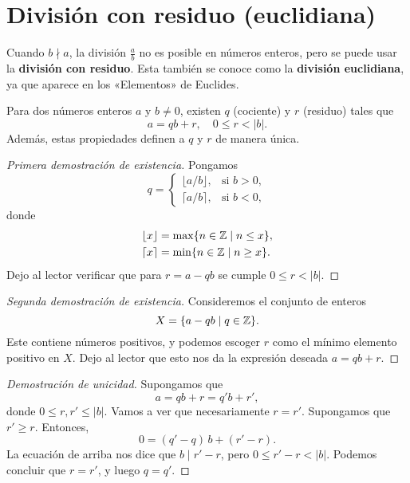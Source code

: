 
\section{División con residuo (euclidiana)}

Cuando $b \nmid a$, la división $\frac{a}{b}$ no es posible en números enteros,
pero se puede usar la \textbf{división con residuo}. Esta también se conoce como
la \textbf{división euclidiana}, ya que aparece en los «Elementos» de Euclides.

\begin{proposicion}
  Para dos números enteros $a$ y $b \ne 0$, existen $q$ (cociente) y $r$
  (residuo) tales que
  \[ a = qb + r,
    \quad
    0 \le r < |b|. \]
  Además, estas propiedades definen a $q$ y $r$ de manera única.
\end{proposicion}

\begin{proof}[Primera demostración de existencia]
  Pongamos
  \[ q =
    \begin{cases}
      \lfloor a/b\rfloor, & \text{si }b > 0,\\
      \lceil  a/b\rceil,  & \text{si }b < 0,
    \end{cases} \]
  donde
  \begin{align*}
    \lfloor x \rfloor & = \max \{ n \in \mathbb{Z} \mid n \le x \},\\
    \lceil x \rceil & = \min \{ n \in \mathbb{Z} \mid n \ge x \}.
  \end{align*}
  Dejo al lector verificar que para $r = a - qb$ se cumple $0 \le r < |b|$.
\end{proof}

\begin{proof}[Segunda demostración de existencia]
  Consideremos el conjunto de enteros
  $$X = \{ a - qb \mid q \in \mathbb{Z} \}.$$
  Este contiene números positivos, y podemos escoger $r$ como el mínimo elemento
  positivo en $X$. Dejo al lector que esto nos da la expresión deseada
  $a = qb + r$.
\end{proof}

\begin{proof}[Demostración de unicidad]
  Supongamos que
  $$a = qb + r = q' b + r',$$
  donde $0 \le r, r' \le |b|$. Vamos a ver que necesariamente $r = r'$.
  Supongamos que $r' \ge r$. Entonces,
  $$0 = (q'-q)\,b + (r'-r).$$
  La ecuación de arriba nos dice que $b \mid r' - r$, pero
  $0 \le r' - r < |b|$. Podemos concluir que $r = r'$, y luego $q = q'$.
\end{proof}


